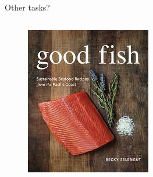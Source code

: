\documentclass{beamer}
\begin{document}
\begin{frame}{Other tasks?}
\begin{columns}
\begin{column}{0.5\textwidth}
			\begin{figure}
			\includegraphics[scale=1]{fish_sustainable}
			\end{figure}

		\end{column}
	\end{columns}
	
\end{frame}
\end{document}
